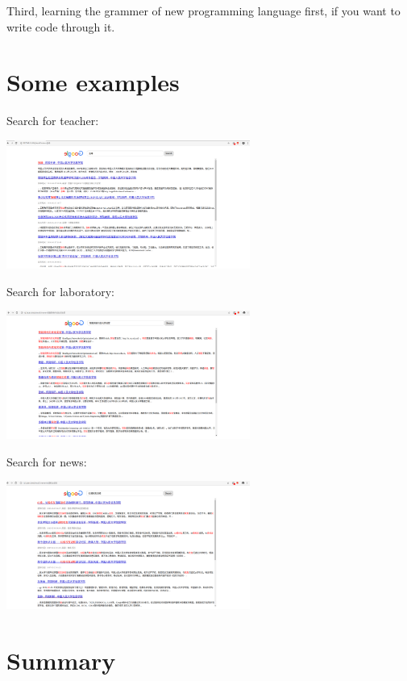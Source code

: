 \documentclass[a4paper]{article}
\begin{document}
	Third, learning the grammer of new programming language first, if you want to write code through it.

\section{Some examples}
	
	Search for teacher:
	\begin{center}
		\includegraphics[width=0.6\textwidth, height=0.2\textheight]{zf.png}
	\end{center}
		
	Search for laboratory:
	\begin{center}
		\includegraphics[width=0.6\textwidth, height=0.2\textheight]{lab.png}
	\end{center}

	Search for news:
	\begin{center}
		\includegraphics[width=0.6\textwidth, height=0.2\textheight]{82.png}
	\end{center}

\section{Summary}
	
\end{document}

